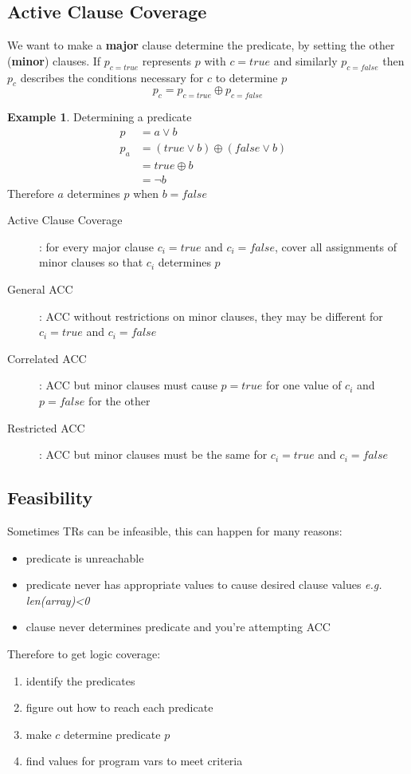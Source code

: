 \documentclass[]{article}
\theoremstyle{definition}
\newtheorem{ex}{Example}[section]
\begin{document}
		\subsection{Active Clause Coverage}
		We want to make a \textbf{major} clause determine the predicate, by setting the other (\textbf{minor}) clauses.
		If $p_{c=true}$ represents $p$ with $c = true$ and similarly $p_{c=false}$ then $p_c$ describes the conditions necessary
		for $c$ to determine $p$
		\begin{equation*}
			p_c = p_{c=true} \oplus p_{c=false}
		\end{equation*}

		\begin{ex}
			Determining a predicate
			\begin{align*}
				p &= a \lor b & \\
				p_a &= (true \lor b) \oplus (false \lor b) & \\
				&= true \oplus b & \\
				&= \neg b &
			\end{align*}
			Therefore $a$ determines $p$ when $b = false$
		\end{ex}

		\begin{description}
			\item[Active Clause Coverage]: for every major clause $c_i = true$ and $c_i = false$, cover all assignments of minor clauses so that $c_i$ determines $p$ 
			\item[General ACC]: ACC without restrictions on minor clauses, they may be different for $c_i = true$ and $c_i = false$
			\item[Correlated ACC]: ACC but minor clauses must cause $p = true$ for one value of $c_i$ and $p = false$ for the other
			\item[Restricted ACC]: ACC but minor clauses must be the same for $c_i = true$ and $c_i = false$
		\end{description}
		\subsection{Feasibility}
		Sometimes TRs can be infeasible, this can happen for many reasons:
		\begin{itemize}
			\item predicate is unreachable
			\item predicate never has appropriate values to cause desired clause values \textit{e.g. len(array)<0} 
			\item clause never determines predicate and you're attempting ACC
		\end{itemize}
		Therefore to get logic coverage:
		\begin{enumerate}
			\item identify the predicates 
			\item figure out how to reach each predicate
			\item make $c$ determine predicate $p$
			\item find values for program vars to meet criteria
		\end{enumerate}
\end{document}
